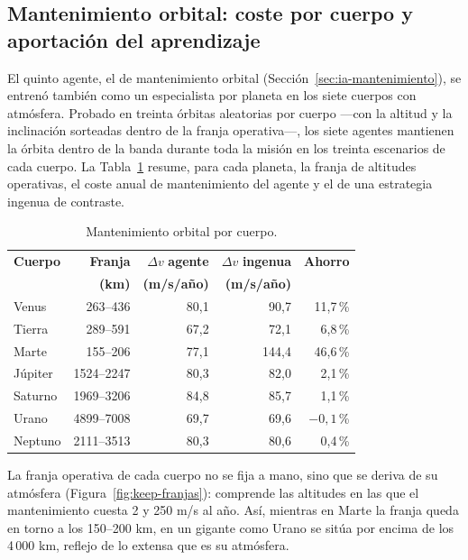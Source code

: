 \subsection{Mantenimiento orbital: coste por cuerpo y aportación del aprendizaje}
\label{sec:res-ia-mantenimiento}

El quinto agente, el de mantenimiento orbital (Sección~\ref{sec:ia-mantenimiento}), se entrenó también como un especialista por planeta en los siete cuerpos con atmósfera. Probado en treinta órbitas aleatorias por cuerpo ---con la altitud y la inclinación sorteadas dentro de la franja operativa---, los siete agentes mantienen la órbita dentro de la banda durante toda la misión en los treinta escenarios de cada cuerpo. La Tabla~\ref{tab:res-keep} resume, para cada planeta, la franja de altitudes operativas, el coste anual de mantenimiento del agente y el de una estrategia ingenua de contraste.

\begin{table}[htbp]
  \centering
  \caption{Mantenimiento orbital por cuerpo.}
  \label{tab:res-keep}
  \begin{tabular}{lrrrr}
    \hline
    \textbf{Cuerpo} & \textbf{Franja} & {\boldmath $\Delta v$} \textbf{agente} & {\boldmath $\Delta v$} \textbf{ingenua} & \textbf{Ahorro} \\
     & \textbf{(km)} & \textbf{(m/s/año)} & \textbf{(m/s/año)} & \\
    \hline
    Venus   & 263--436    & 80,1 & 90,7  & 11,7\,\% \\
    Tierra  & 289--591    & 67,2 & 72,1  & 6,8\,\%  \\
    Marte   & 155--206    & 77,1 & 144,4 & 46,6\,\% \\
    Júpiter & 1524--2247  & 80,3 & 82,0  & 2,1\,\%  \\
    Saturno & 1969--3206  & 84,8 & 85,7  & 1,1\,\%  \\
    Urano   & 4899--7008  & 69,7 & 69,6  & $-0{,}1$\,\% \\
    Neptuno & 2111--3513  & 80,3 & 80,6  & 0,4\,\%  \\
    \hline
  \end{tabular}
\end{table}

La franja operativa de cada cuerpo no se fija a mano, sino que se deriva de su atmósfera (Figura~\ref{fig:keep-franjas}): comprende las altitudes en las que el mantenimiento cuesta 2 y 250 m/s al año. Así, mientras en Marte la franja queda en torno a los 150--200 km, en un gigante como Urano se sitúa por encima de los 4\,000 km, reflejo de lo extensa que es su atmósfera.

